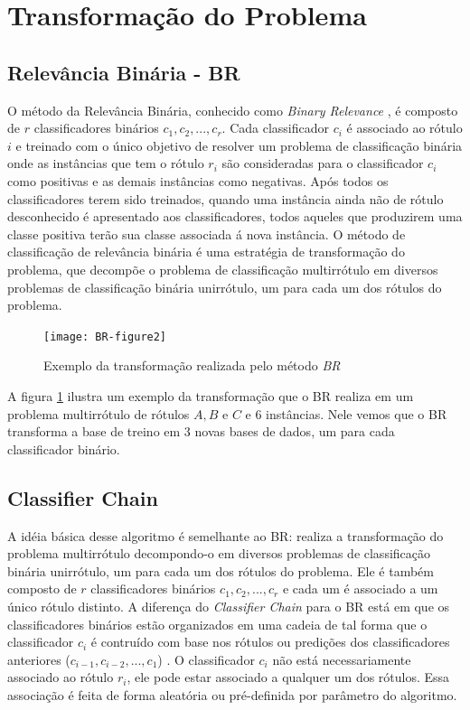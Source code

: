 \section{Transformação do Problema}
\subsection{Relevância Binária - BR}
\label{sec:br}


O método da Relevância Binária, conhecido como \textit{Binary Relevance} \cite{br2010}, 
é composto de $r$ classificadores binários $c_1,c_2,...,c_r$. Cada classificador $c_i$ 
é associado ao rótulo $i$ e treinado com o único objetivo de resolver
um problema de classificação binária onde as instâncias que
tem o rótulo $r_i$ são consideradas para o classificador $c_i$ como positivas
e as demais instâncias como
negativas. 
Após todos os classificadores terem sido treinados, quando uma instância
ainda não de rótulo desconhecido 
é apresentado aos classificadores, todos aqueles que produzirem uma classe positiva
terão sua classe associada á nova instância.
O método de classificação de relevância binária é uma estratégia de transformação do
problema, que decompõe o problema de classificação multirrótulo em diversos problemas
de classificação binária unirrótulo, um para cada um dos rótulos do problema.

\begin{figure}
 \texttt{[image: BR-figure2]}
 
 \caption{Exemplo da transformação realizada pelo método \textit{BR}}
\label{fig:br}

\end{figure}

A figura \ref{fig:br} ilustra um exemplo da transformação que o BR realiza em um problema multirrótulo
de rótulos $A,B$ e $C$ e 6 instâncias. Nele vemos que o BR transforma a base de treino em 3 novas bases
de dados, um para cada classificador binário.





\subsection{Classifier Chain}


A idéia básica desse algoritmo é semelhante ao BR: realiza a transformação do
problema multirrótulo decompondo-o em diversos problemas
de classificação binária unirrótulo, um para cada um dos rótulos do problema.
Ele é também composto de $r$ classificadores binários $c_1,c_2,...,c_r$ e cada um
é associado a um único rótulo distinto. A diferença do \textit{Classifier Chain} para o BR está
em que os classificadores binários estão organizados em uma cadeia de tal forma que
o classificador $c_i$ é contruído com base nos rótulos ou predições dos classificadores anteriores
($c_{i-1},c_{i-2},...,c_{1}$) \cite{cc2009}. O classificador $c_i$ não está necessariamente associado ao rótulo $r_i$,
ele pode estar associado a qualquer um dos rótulos.
Essa associação é feita de forma aleatória ou pré-definida por parâmetro do algoritmo.

